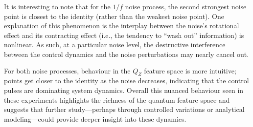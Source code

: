 \documentclass[12pt]{iopart}
\begin{document}
It is interesting to note that for the $1/f$ noise process, the second strongest noise point is closest to the identity (rather than the weakest noise point). One explanation of this phenomenon is the interplay between the noise's rotational effect and its contracting effect (i.e., the tendency to “wash out” information) is nonlinear. As such, at a particular noise level, the destructive interference between the control dynamics and the noise perturbations may nearly cancel out.

For both noise processes, behaviour in the $Q_Z$ feature space is more intuitive; points get closer to the identity as the noise decreases, indicating that the control pulses are dominating system dynamics. Overall this nuanced behaviour seen in these experiments highlights the richness of the quantum feature space and suggests that further study—perhaps through controlled variations or analytical modeling—could provide deeper insight into these dynamics.
\end{document}
